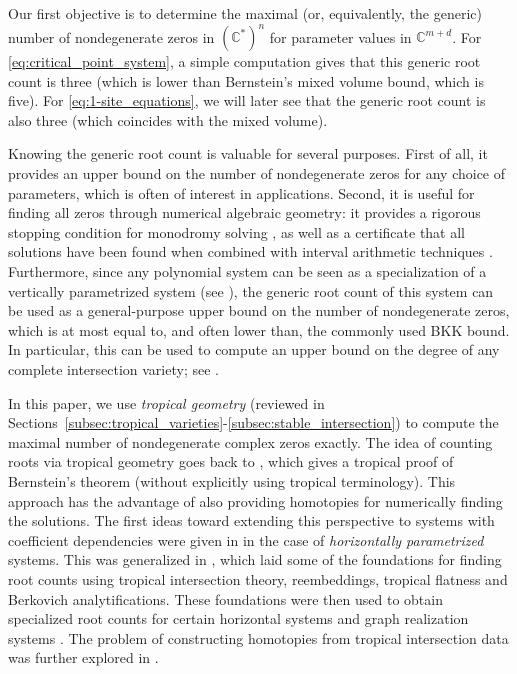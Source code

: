 \documentclass[11pt,reqno,a4paper]{amsart}
\numberwithin{equation}{section}
\theoremstyle{theoremstyle}
\theoremstyle{examplestyle}
\newcommand{\CC}{\mathbb{C}}
\begin{document}
Our first objective is to determine the maximal (or, equivalently, the generic) number of nondegenerate zeros in $(\CC^*)^n$ for parameter values in $\CC^{m+d}$. For \eqref{eq:critical_point_system}, a simple computation gives that this generic root count is three (which is lower than Bernstein's mixed volume bound, which is five). For \eqref{eq:1-site_equations}, we will later see that the generic root count is also three (which coincides with the mixed volume).

Knowing the generic root count is valuable for several purposes. First of all, it provides an upper bound on the number of nondegenerate zeros for any choice of parameters, which is often of interest in applications.
Second, it is useful for finding all zeros through numerical algebraic geometry: it provides a rigorous stopping condition for monodromy solving \cite{BBCHLS2023}, as well as a certificate that all solutions have been found when combined with interval arithmetic techniques \cite{BreidingRoseTimme23}. Furthermore, since any polynomial system can be seen as a specialization of a vertically parametrized system (see ), the generic root count of this system can be used as a general-purpose upper bound on the number of nondegenerate zeros, which is at most equal to, and often lower than, the commonly used BKK bound. 
In particular, this can be used to compute an upper bound on the degree of any complete intersection variety; see . 
 

In this paper, we use \emph{tropical geometry} (reviewed in Sections~\ref{subsec:tropical_varieties}\nobreakdash-\ref{subsec:stable_intersection}) to compute the maximal number of nondegenerate complex zeros exactly.
The idea of counting roots via tropical geometry goes back to \cite{HuberSturmfels95}, which gives a tropical proof of Bernstein's theorem (without explicitly using tropical terminology). This approach has the advantage of also providing homotopies for numerically finding the solutions. 
The first ideas toward extending this perspective to systems with coefficient dependencies were given in \cite{LeykinYu2019} in the case of \emph{horizontally parametrized} systems. 
This was generalized in \cite{HelminckRen22}, which laid some of the foundations for finding root counts using tropical intersection theory, reembeddings, tropical flatness and Berkovich analytifications. 
These foundations were then used to obtain specialized root counts for certain horizontal systems \cite{HoltRen2023} and graph realization systems \cite{ClarkeDewarTrippGreenMaxwellNixonRenSmith2026}. 
The problem of constructing homotopies from tropical intersection data was further explored in \cite{HelminckHenrikssonRen2024}.
\end{document}
